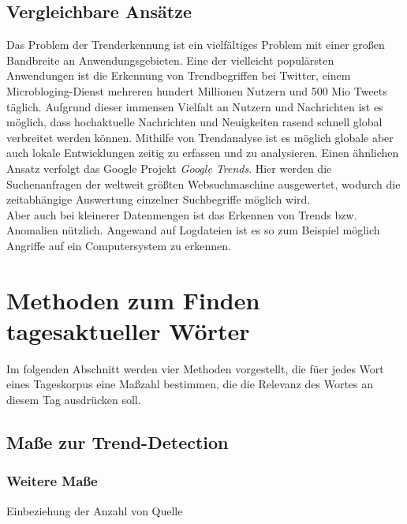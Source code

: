 \section{Vergleichbare Ansätze}
Das Problem der Trenderkennung ist ein vielfältiges Problem mit einer großen Bandbreite an Anwendungsgebieten. Eine der vielleicht populärsten Anwendungen ist die Erkennung von Trendbegriffen bei Twitter, einem Microbloging-Dienst mehreren hundert Millionen Nutzern und 500 Mio Tweets täglich. Aufgrund dieser immensen Vielfalt an Nutzern und Nachrichten ist es möglich, dass hochaktuelle Nachrichten und Neuigkeiten rasend schnell global verbreitet werden können. Mithilfe von Trendanalyse ist es möglich globale aber auch lokale Entwicklungen zeitig zu erfassen und zu analysieren.
Einen ähnlichen Ansatz verfolgt das Google Projekt \emph{Google Trends}. Hier werden die Suchenanfragen der weltweit größten Websuchmaschine ausgewertet, wodurch die zeitabhängige Auswertung einzelner Suchbegriffe möglich wird. \\
Aber auch bei kleinerer Datenmengen ist das Erkennen von Trends bzw. Anomalien nützlich. Angewand auf Logdateien ist es so zum Beispiel möglich Angriffe auf ein Computersystem zu erkennen. \cite{Zwietasch14}


\chapter{Methoden zum Finden tagesaktueller Wörter}
Im folgenden Abschnitt werden vier Methoden vorgestellt, die f\"uer jedes Wort eines Tageskorpus eine Ma\ss zahl bestimmen, die die Relevanz des Wortes an diesem Tag ausdr\"ucken soll.

\section{Maße zur Trend-Detection}





\subsection{Weitere Maße}
Einbeziehung der Anzahl von Quelle

